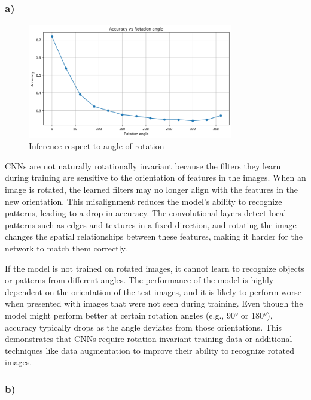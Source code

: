 \documentclass{article}
\begin{document}
\subsubsection*{a)}

\begin{figure}[H]
    \centering
    \includegraphics[width=0.8\textwidth]{images/rot_angles.png}
    \caption{Inference respect to angle of rotation}
    \label{fig:angle_inference}
\end{figure}

CNNs are not naturally rotationally invariant because the filters they learn during training are sensitive to the orientation
of features in the images. When an image is rotated, the learned filters may no longer align with the features in the new
orientation. This misalignment reduces the model's ability to recognize patterns, leading to a drop in accuracy. The
convolutional layers detect local patterns such as edges and textures in a fixed direction, and rotating the image changes
the spatial relationships between these features, making it harder for the network to match them correctly.

If the model is not trained on rotated images, it cannot learn to recognize objects or patterns from different angles.
The performance of the model is highly dependent on the orientation of the test images, and it is likely to perform worse
when presented with images that were not seen during training. Even though the model might perform better at certain rotation
angles (e.g., 90° or 180°), accuracy typically drops as the angle deviates from those orientations. This demonstrates that
CNNs require rotation-invariant training data or additional techniques like data augmentation to improve their ability to
recognize rotated images.

\subsubsection*{b)}
\end{document}
